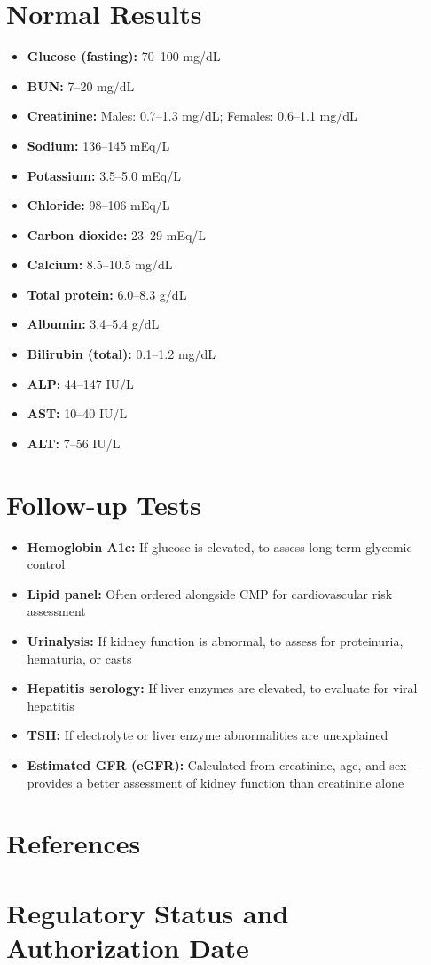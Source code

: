 \section*{Normal Results}
\begin{itemize}
  \item \textbf{Glucose (fasting):} 70--100 mg/dL
  \item \textbf{BUN:} 7--20 mg/dL
  \item \textbf{Creatinine:} Males: 0.7--1.3 mg/dL; Females: 0.6--1.1 mg/dL
  \item \textbf{Sodium:} 136--145 mEq/L
  \item \textbf{Potassium:} 3.5--5.0 mEq/L
  \item \textbf{Chloride:} 98--106 mEq/L
  \item \textbf{Carbon dioxide:} 23--29 mEq/L
  \item \textbf{Calcium:} 8.5--10.5 mg/dL
  \item \textbf{Total protein:} 6.0--8.3 g/dL
  \item \textbf{Albumin:} 3.4--5.4 g/dL
  \item \textbf{Bilirubin (total):} 0.1--1.2 mg/dL
  \item \textbf{ALP:} 44--147 IU/L
  \item \textbf{AST:} 10--40 IU/L
  \item \textbf{ALT:} 7--56 IU/L
\end{itemize}

\section*{Follow-up Tests}
\begin{itemize}
  \item \textbf{Hemoglobin A1c:} If glucose is elevated, to assess long-term glycemic control
  \item \textbf{Lipid panel:} Often ordered alongside CMP for cardiovascular risk assessment
  \item \textbf{Urinalysis:} If kidney function is abnormal, to assess for proteinuria, hematuria, or casts
  \item \textbf{Hepatitis serology:} If liver enzymes are elevated, to evaluate for viral hepatitis
  \item \textbf{TSH:} If electrolyte or liver enzyme abnormalities are unexplained
  \item \textbf{Estimated GFR (eGFR):} Calculated from creatinine, age, and sex --- provides a better assessment of kidney function than creatinine alone
\end{itemize}


\section*{References}



\clearpage
\section*{Regulatory Status and Authorization Date}

\clearpage

